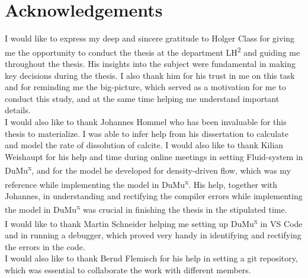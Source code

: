 \chapter*{Acknowledgements}
\thispagestyle{empty}
I would like to express my deep and sincere gratitude to Holger Class for giving me the opportunity 
to conduct the thesis at the department LH\textsuperscript{2} and guiding me throughout the thesis. 
His insights into the subject were fundamental in making key decisions during the thesis. 
I also thank him for his trust in me on this task and for reminding me the big-picture, which 
served as a motivation for me to conduct this study, and at the same time helping me understand 
important details. \\

I would also like to thank Johannes Hommel who has been invaluable for this thesis to materialize. 
I was able to infer help from his dissertation to calculate and model the rate of dissolution of calcite. 
I would also like to thank Kilian Weishaupt for his help and time during online meetings in setting 
Fluid-system in DuMu\textsuperscript{x}, and for the model he developed for density-driven flow, 
which was my reference while implementing the model in DuMu\textsuperscript{x}. His help, together 
with Johannes, in understanding and rectifying the compiler errors while implementing the model in 
DuMu\textsuperscript{x} was crucial in finishing the thesis in the stipulated time.\\

I would like to thank Martin Schneider helping me setting up DuMu\textsuperscript{x} in VS Code 
and in running a debugger, which proved very handy in identifying and rectifying the errors in the code. \\
I would also like to thank Bernd Flemisch for his help in setting a git repository, which was essential 
to collaborate the work with different members.
\endinput